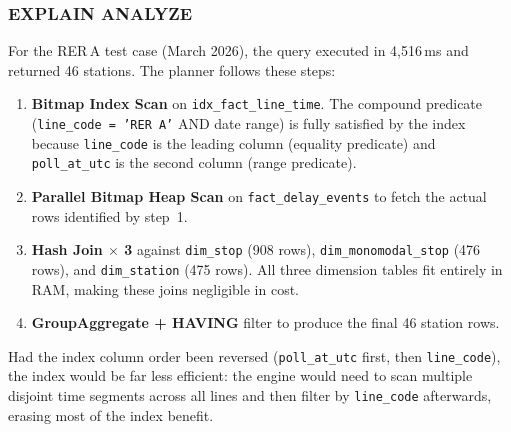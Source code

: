 \documentclass[a4paper,11pt]{article}
\begin{document}
\subsubsection{EXPLAIN ANALYZE}

For the RER\,A test case (March 2026), the query executed in 4,516\,ms
and returned 46 stations. The planner follows these steps:
\begin{enumerate}
  \item \textbf{Bitmap Index Scan} on \texttt{idx\_fact\_line\_time}.
    The compound predicate (\texttt{line\_code = 'RER A'} AND date range) is fully
    satisfied by the index because \texttt{line\_code} is the leading column
    (equality predicate) and \texttt{poll\_at\_utc} is the second column (range predicate).
  \item \textbf{Parallel Bitmap Heap Scan} on \texttt{fact\_delay\_events} to
    fetch the actual rows identified by step~1.
  \item \textbf{Hash Join $\times$ 3} against \texttt{dim\_stop} (908 rows),
    \texttt{dim\_monomodal\_stop} (476 rows), and \texttt{dim\_station} (475 rows).
    All three dimension tables fit entirely in RAM, making these joins negligible in cost.
  \item \textbf{GroupAggregate + HAVING} filter to produce the final 46 station rows.
\end{enumerate}

Had the index column order been reversed (\texttt{poll\_at\_utc} first, then
\texttt{line\_code}), the index would be far less efficient: the engine would
need to scan multiple disjoint time segments across all lines and then filter
by \texttt{line\_code} afterwards, erasing most of the index benefit.
\end{document}
